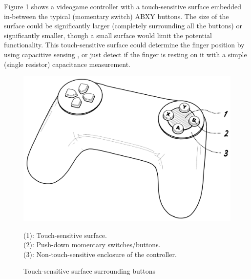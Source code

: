 \documentclass[10pt, twocolumn, a4paper]{article}
\begin{document}
    Figure \ref{fig_1} shows a videogame controller with a touch-sensitive surface embedded in-between the typical (momentary switch) ABXY buttons. The size of the surface could be significantly larger (completely surrounding all the buttons) or significantly smaller, though a small surface would limit the potential functionality. This touch-sensitive surface could determine the finger position by using capacitive sensing \cite{capacitative}, or just detect if the finger is resting on it with a simple (single resistor) capacitance measurement.
    \begin{figure}[H]
        \begin{center}
            \includegraphics[width=0.9\linewidth]{figure_A1.png}
            \caption{Touch-sensitive surface surrounding buttons\\}
            \label{fig_1}
            \small
                \vspace{2mm}
                (1): Touch-sensitive surface.\\
                (2): Push-down momentary switches/buttons.\\
                (3): Non-touch-sensitive enclosure of the controller.
        \end{center}
    \end{figure}
\end{document}
